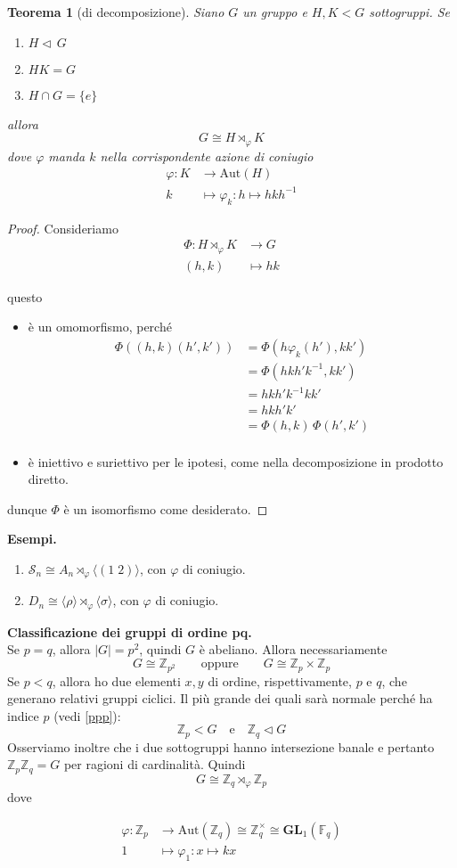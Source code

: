 \documentclass[a4paper]{article}
\newtheorem{theorem}{Teorema}[section]
\theoremstyle{remark}
\theoremstyle{definition}
\newcommand{\Aut}[1]{\mathrm{Aut}\left( #1 \right)}
\newcommand{\Z}{\mathbb{Z}}
\newcommand{\fun}[5]{
	\begin{align*}
	#1 \colon #2 &\to #3 \\
	#4 &\mapsto #5
	\end{align*}
}
\begin{document}
\begin{multicols}{2}
\begin{theorem}[di decomposizione]
	Siano $ G $ un gruppo e $ H, K < G $ sottogruppi. Se
	\begin{enumerate}
		\item $ H \lhd\, G $
		\item $ HK = G $
		\item $ H \cap G = \{e\} $
	\end{enumerate}
allora $$  G \cong H \rtimes_\varphi K  $$ dove $ \varphi $ manda $ k $ nella corrispondente azione di coniugio \fun{\varphi}{K}{\Aut{H}}{k}{\varphi_k : h \mapsto hkh^{-1}}
\end{theorem}
\begin{proof}
	Consideriamo \fun{\Phi}{H \rtimes_\varphi K}{G}{(h, k)}{hk}
	questo
	\begin{itemize}
		\item è un omomorfismo, perché \begin{align*}
			\Phi((h, k)(h', k')) &= \Phi(h\varphi_k(h'), kk') \\
			&= \Phi(hkh'k^{-1}, kk') \\
			&= hkh'k^{-1}kk' \\
			&= hkh'k'\\
			&= \Phi(h, k)\,\Phi(h', k')\\
		\end{align*}
		\item è iniettivo e suriettivo per le ipotesi, come nella decomposizione in prodotto diretto.
	\end{itemize}
dunque $ \Phi $ è un isomorfismo come desiderato.
\end{proof}

\textbf{Esempi.}
\begin{enumerate}
	\item $ \mathcal{S}_n \cong A_n \rtimes_\varphi \langle (1 \; 2) \rangle $, con $ \varphi $ di coniugio.
	\item $ D_n \cong \langle \rho \rangle \rtimes_\varphi \langle \sigma \rangle $, con $ \varphi $ di coniugio.
\end{enumerate}

\columnbreak
\textbf{Classificazione dei gruppi di ordine pq.} \\

Se $ p = q $, allora $ |G| = p^2 $, quindi $ G $ è abeliano. Allora necessariamente
\[ G \cong \mathbb{Z}_{p^2}  \qquad \text{oppure} \qquad G \cong \mathbb{Z}_{p}\times\mathbb{Z}_{p} \]
Se $ p < q $, allora ho due elementi $ x, y $ di ordine, rispettivamente, $ p $ e $ q $, che generano relativi gruppi ciclici. Il più grande dei quali sarà normale perché ha indice $ p $ (vedi \ref{ppp}):
$$  \mathbb{Z}_p < G \quad\text{e}\quad \Z_q \lhd G $$
Osserviamo inoltre che i due sottogruppi hanno intersezione banale e pertanto $ \Z_p\Z_q = G $ per ragioni di cardinalità. Quindi
\[ G \cong \Z_q \rtimes_{\varphi} \Z_p \]
dove
\fun{\varphi}{\Z_p}{\Aut{\Z_q}  \cong \mathbb{Z}_q^\times \cong \mathbf{GL}_1(\mathbb{F}_q)}{1}{\varphi_1: x \mapsto kx}


\end{multicols}
\end{document}
